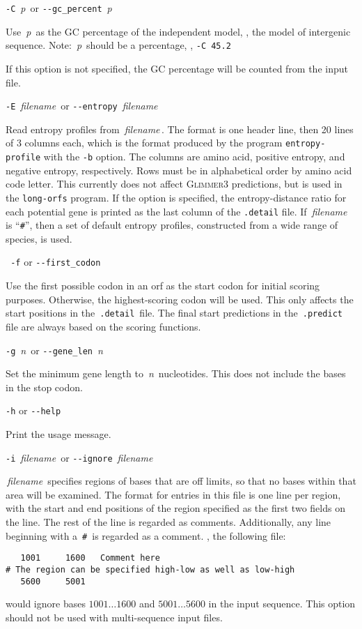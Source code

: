 \documentclass[fleqn,titlepage,11pt]{article}
\def\Desc#1{\,\mbox{\emph{#1}}\,}
\def\Gthree{\textsc{Glimmer3}}
\def\Pg#1{\texttt{#1}}
\begin{document}
\exdent
  \verb`-C` \Desc{p} \enskip or \enskip \verb`--gc_percent` \Desc{p}

  Use \Desc{p} as the GC percentage of the independent model, \ie,
  the model of intergenic sequence.
  Note:  \Desc{p} should be a percentage, \eg, \verb`-C 45.2`

  If this option is not specified, the GC percentage will be
  counted from the input file.

\exdent
  \verb`-E` \Desc{filename} \enskip or \enskip \verb`--entropy` \Desc{filename}

  Read entropy profiles from \Desc{filename}.  The format is one header
  line, then 20 lines of 3 columns each, which is the format produced
  by the program \Pg{entropy-profile} with the \Pg{-b} option.
  The columns are amino acid,
  positive entropy, and negative entropy, respectively.  Rows must be in
  alphabetical order by amino acid code letter.  This currently does
  not affect \Gthree{} predictions, but is used in
  the \Pg{long-orfs} program.  If the option is specified, the
  entropy-distance ratio for each potential gene is printed as the last column
  of the \Pg{.detail} file.  If \Desc{filename} is ``\Pg{\#}'', then
  a set of default entropy profiles, constructed from a wide range of
  species, is used.

\exdent
 \verb` -f` \enskip or \enskip \verb`--first_codon`

  Use the first possible codon in an orf as the start codon
  for initial scoring purposes.  Otherwise, the highest-scoring
  codon will be used.  This only affects the start positions in
  the \,\verb`.detail`\, file.  The final start predictions in
  the \,\verb`.predict`\, file are always based on the scoring
  functions.

\exdent
  \verb`-g` \Desc{n} \enskip or \enskip \verb`--gene_len` \Desc{n}

  Set the minimum gene length to \Desc{n} nucleotides.  This does not include
  the bases in the stop codon.

\exdent
  \verb`-h` \enskip or \enskip \verb`--help`

  Print the usage message.

\exdent
  \verb`-i` \Desc{filename} \enskip or \enskip \verb`--ignore` \Desc{filename}

  \Desc{filename} specifies regions of bases that are off 
  limits, so that no bases within that area will be examined.
  The format for entries in this file is one line per region,
  with the start and end positions of the region specified
  as the first two fields on the line.  The rest of the line
  is regarded as comments.  Additionally, any line beginning
  with a \,\verb`#`\, is regarded as a comment.  \Eg, the
  following file:
\BSV\begin{verbatim}
   1001     1600   Comment here
# The region can be specified high-low as well as low-high
   5600     5001
\end{verbatim}\ESV
  would ignore bases $1001 \ldots 1600$ and $5001 \ldots 5600$
  in the input sequence.  This option should not be used with
  multi-sequence input files.
\end{document}
